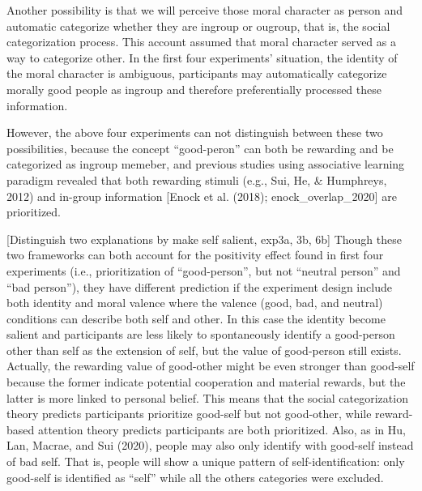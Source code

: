 \documentclass[
  english,
  man]{apa6}
\begin{document}
Another possibility is that we will perceive those moral character as person and automatic categorize whether they are ingroup or ougroup, that is, the social categorization process. This account assumed that moral character served as a way to categorize other. In the first four experiments' situation, the identity of the moral character is ambiguous, participants may automatically categorize morally good people as ingroup and therefore preferentially processed these information.

However, the above four experiments can not distinguish between these two possibilities, because the concept \enquote{good-peron} can both be rewarding and be categorized as ingroup memeber, and previous studies using associative learning paradigm revealed that both rewarding stimuli (e.g., Sui, He, \& Humphreys, 2012) and in-group information {[}Enock et al. (2018); enock\_overlap\_2020{]} are prioritized.

{[}Distinguish two explanations by make self salient, exp3a, 3b, 6b{]} Though these two frameworks can both account for the positivity effect found in first four experiments (i.e., prioritization of \enquote{good-person}, but not \enquote{neutral person} and \enquote{bad person}), they have different prediction if the experiment design include both identity and moral valence where the valence (good, bad, and neutral) conditions can describe both self and other. In this case the identity become salient and participants are less likely to spontaneously identify a good-person other than self as the extension of self, but the value of good-person still exists. Actually, the rewarding value of good-other might be even stronger than good-self because the former indicate potential cooperation and material rewards, but the latter is more linked to personal belief. This means that the social categorization theory predicts participants prioritize good-self but not good-other, while reward-based attention theory predicts participants are both prioritized. Also, as in Hu, Lan, Macrae, and Sui (2020), people may also only identify with good-self instead of bad self. That is, people will show a unique pattern of self-identification: only good-self is identified as \enquote{self} while all the others categories were excluded.
\end{document}
